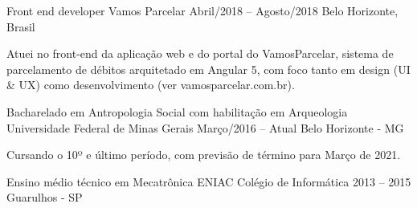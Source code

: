 \documentclass[10pt,a4paper]{styling}
\begin{document}
\divider
%


\cvevent
{Front end developer}
{Vamos Parcelar}
{Abril/2018 -- Agosto/2018}
{Belo Horizonte, Brasil}

{Atuei no front-end da aplicação web e do portal do VamosParcelar, sistema de parcelamento de débitos arquitetado em Angular 5, com foco tanto em design (UI \& UX) como desenvolvimento (ver vamosparcelar.com.br).}

\divider

\medskip


\cvevent
{Bacharelado em Antropologia Social com habilitação em Arqueologia}
{Universidade Federal de Minas Gerais}
{Março/2016 -- Atual}
{Belo Horizonte - MG}

Cursando o 10º e último período, com previsão de término para Março de 2021.

\divider

\cvevent
{Ensino médio técnico em Mecatrônica}
{ENIAC Colégio de Informática}
{2013 -- 2015}
{Guarulhos - SP}
\end{document}
